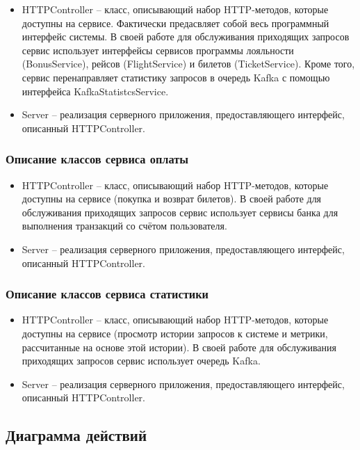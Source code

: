 \begin{itemize}
    \item HTTPController -- класс, описывающий набор  HTTP-методов, которые доступны на сервисе. Фактически предасвляет собой весь программный интерфейс системы. В своей работе для обслуживания приходящих запросов сервис использует интерфейсы сервисов программы лояльности (BonusService), рейсов (FlightService) и билетов (TicketService). Кроме того, сервис перенаправляет статистику запросов в очередь Kafka с помощью интерфейса KafkaStatistcsService.
    \item Server -- реализация серверного приложения, предоставляющего интерфейс, описанный HTTPController.
\end{itemize}

\subsubsection{Описание классов сервиса оплаты}

\begin{itemize}
    \item HTTPController -- класс, описывающий набор  HTTP-методов, которые доступны на сервисе (покупка и возврат билетов). В своей работе для обслуживания приходящих запросов сервис использует сервисы банка для выполнения транзакций со счётом пользователя.
    \item Server -- реализация серверного приложения, предоставляющего интерфейс, описанный HTTPController.
\end{itemize}

\subsubsection{Описание классов сервиса статистики}
\begin{itemize}
    \item HTTPController -- класс, описывающий набор  HTTP-методов, которые доступны на сервисе (просмотр истории запросов к системе и метрики, рассчитанные на основе этой истории). В своей работе для обслуживания приходящих запросов сервис использует очередь Kafka.
    \item Server -- реализация серверного приложения, предоставляющего интерфейс, описанный HTTPController.
\end{itemize}

\subsection*{Диаграмма действий}

